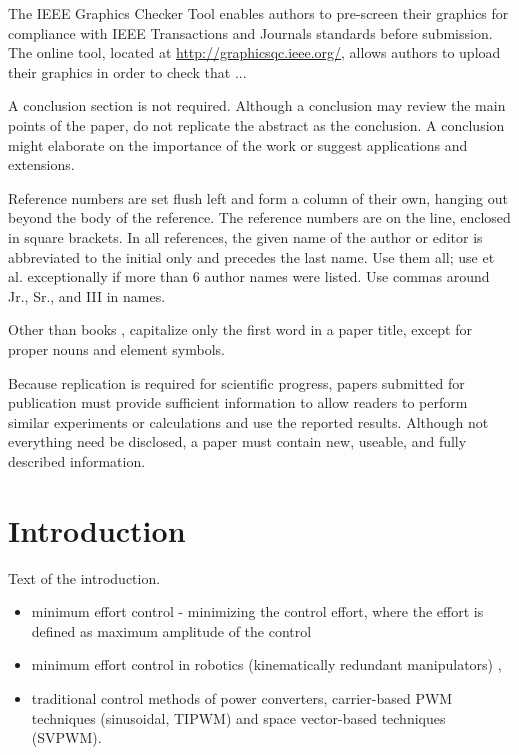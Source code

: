 \documentclass[journal]{IEEEtranTIE}
\theoremstyle{definition}
\begin{document}
The IEEE Graphics Checker Tool enables authors to pre-screen their graphics for compliance with IEEE Transactions and Journals standards before submission. The online tool, located at \url{http://graphicsqc.ieee.org/}, allows authors to upload their graphics in order to check that ... 

A conclusion section is not required. Although a conclusion may review the main points of the paper, do not replicate the abstract as the conclusion. A conclusion might elaborate on the importance of the work or suggest applications and extensions.

Reference numbers are set flush left and form a column of their own, hanging out beyond the body of the reference. The reference numbers are on the line, enclosed in square brackets. In all references, the given name of the author or editor is abbreviated to the initial only and precedes the last name. Use them all; use et al. exceptionally if more than 6 author names were listed. Use commas around Jr., Sr., and III in names. 

Other than books \cite{inbook1, book1, book2, book3}, capitalize only the first word in a paper title, except for proper nouns and element symbols. 

Because replication is required for scientific progress, papers submitted for publication must provide sufficient information to allow readers to perform similar experiments or calculations and use the reported results. Although not everything need be disclosed, a paper must contain new, useable, and fully described information.

\newpage





\section{Introduction}

Text of the introduction.
\begin{itemize}
\item minimum effort control - minimizing the control effort, where the
effort is defined as maximum amplitude of the control \cite{neustadt1962minimum,porter1966note,Tomlin1975}
\item minimum effort control in robotics (kinematically redundant manipulators)
\cite{ajoudani2013human,lee2001structured,Shim1998,Lee&Ha2001}, 
\item traditional control methods of power converters, carrier-based PWM
techniques (sinusoidal, TIPWM) and space vector-based techniques (SVPWM).
\end{itemize}
\end{document}
